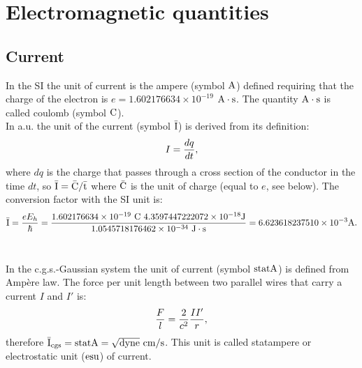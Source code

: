 \documentclass[12pt,a4paper,twoside]{report}
\def\hbarf{1.0545718176462\times 10^{-34}}
\def\e{1.602176634\times 10^{-19}}
\def\baru{4.3597447222072\times 10^{-18}}
\def\bari{6.623618237510\times 10^{-3}}
\def\barc{1.602176634\times 10^{-19}}
\begin{document}
\newpage

{\color{dark-blue}\chapter{Electromagnetic quantities}

{\color{coral}\section{Current}}
\color{black}
In the SI the unit of current is the ampere (symbol ${\rm A}$) defined
requiring that the charge of the electron is $e=\e$ ${\rm A}\cdot {\rm s}$.
The quantity ${\rm A}\cdot {\rm s}$ is called coulomb (symbol ${\rm C}$).
\\

{\color{web-blue} In a.u. the unit of the current (symbol ${\rm \bar I}$) is  
derived from its definition:
\begin{equation}
I={dq \over dt}, 
\end{equation}
where $dq$ is the charge that passes through a cross section of the conductor
in the time $dt$, so ${\rm \bar I} = {\rm \bar C} / {\rm \bar t}$ where 
${\rm \bar C}$ is the 
unit of charge (equal to $e$, see below). The conversion factor with the SI unit is:
\begin{equation}
{\rm \bar I} = {e E_h \over \hbar}={\barc\ {\rm C}\ \baru {\rm J} \over 
\hbarf\  {\rm J}\cdot {\rm s}} = \bari {\rm A}.
\end{equation}
}
\\

{\color{orange} In the c.g.s.-Gaussian system the unit of current 
(symbol ${\rm statA}$) is defined from Amp\`ere law. The force per unit length 
between two parallel wires that carry a current $I$ and $I'$ is:
\begin{equation}
{F\over l} = {2\over c^2} {I I'\over r},
\label{force_wire}
\end{equation}
therefore ${\rm \bar I_{cgs}}={\rm statA}=\sqrt{\rm dyne}\ {\rm cm}/{\rm s}$. This unit is called 
statampere or 
electrostatic unit (${\rm esu}$) of current.

}}
\end{document}
